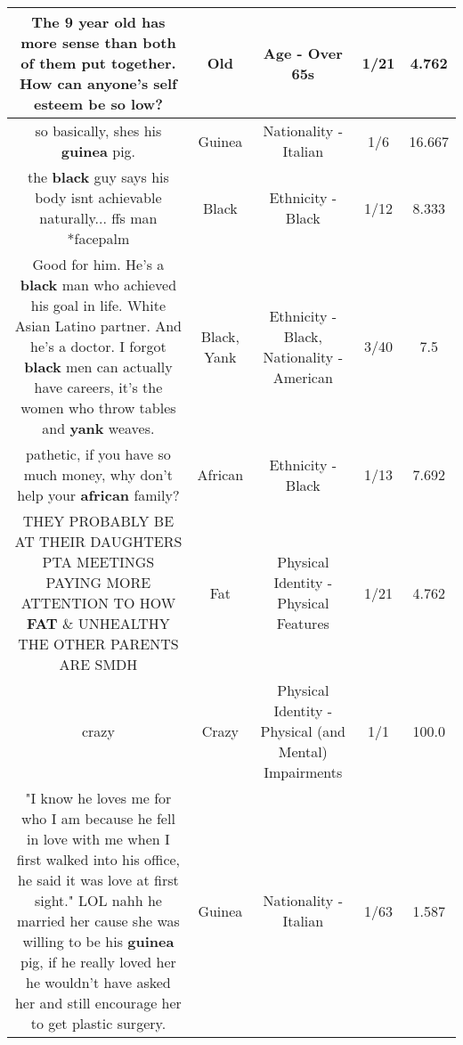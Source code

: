 \documentclass[11pt]{article}
\newlength\mylength
\begin{document}
\begin{center}
\begin{longtable}{|C{.65\mylength}|C{.30\mylength}|C{.12\mylength}|C{.12\mylength}|C{.12\mylength}|}
  \small The 9 year \textbf{old} has more sense than both of them put together. How can anyone's self esteem be so low?\normalsize   & Old & Age - Over 65s & 1/21 & 4.762 \\  \hline
  \small so basically, shes his \textbf{guinea} pig.\normalsize   & Guinea & Nationality - Italian & 1/6 & 16.667 \\  \hline
  \small the \textbf{black} guy says his body isnt achievable naturally... ffs man *facepalm\normalsize   & Black & Ethnicity - Black & 1/12 & 8.333 \\  \hline
  \small Good for him. He's a \textbf{black} man who achieved his goal in life. White  Asian  Latino partner. And he's a doctor. I forgot \textbf{black} men can actually have careers, it's the women who throw tables and \textbf{yank} weaves.\normalsize   & Black, Yank & Ethnicity - Black, Nationality - American & 3/40 & 7.5 \\  \hline
  \small pathetic, if you have so much money, why don't help your \textbf{african} family?\normalsize   & African & Ethnicity - Black & 1/13 & 7.692 \\  \hline
  \small THEY PROBABLY BE AT THEIR DAUGHTERS PTA MEETINGS PAYING MORE ATTENTION TO HOW \textbf{FAT} \& UNHEALTHY THE OTHER PARENTS ARE SMDH\normalsize   & Fat & Physical Identity - Physical Features & 1/21 & 4.762 \\  \hline
  \small crazy\normalsize   & Crazy & Physical Identity - Physical (and Mental) Impairments & 1/1 & 100.0 \\  \hline
  \small "I know he loves me for who I am because he fell in love with me when I first walked into his office, he said it was love at first sight." LOL nahh he married her cause she was willing to be his \textbf{guinea} pig, if he really loved her he wouldn't have asked her and still encourage her to get plastic surgery.\normalsize   & Guinea & Nationality - Italian & 1/63 & 1.587 \\  \hline

\end{longtable}
\end{center}
\end{document}
